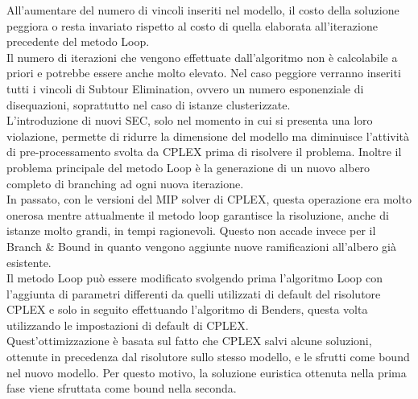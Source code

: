 \vspace{0.5 cm}
All'aumentare del numero di vincoli inseriti nel modello, il costo della soluzione peggiora o resta invariato rispetto al costo di quella elaborata all'iterazione precedente del metodo Loop.\\
Il numero di iterazioni che vengono effettuate dall'algoritmo non è calcolabile a priori e potrebbe essere anche molto elevato. Nel caso peggiore verranno inseriti tutti i vincoli di Subtour Elimination, ovvero un numero esponenziale di disequazioni, soprattutto nel caso di istanze clusterizzate.\\
L'introduzione di nuovi SEC, solo nel momento in cui si presenta una loro violazione, permette di ridurre la dimensione del modello ma diminuisce l'attività di pre-processamento svolta da CPLEX prima di risolvere il problema. Inoltre il problema principale del metodo Loop è la generazione di un nuovo albero completo di branching ad ogni nuova iterazione.\\
In passato, con le versioni del MIP solver di CPLEX, questa operazione era molto onerosa mentre attualmente il metodo loop garantisce la risoluzione, anche di istanze molto grandi, in tempi ragionevoli. Questo non accade invece per il Branch \& Bound in quanto vengono aggiunte nuove ramificazioni all'albero già esistente.\\
Il metodo Loop può essere modificato svolgendo prima l'algoritmo Loop con l'aggiunta di parametri differenti da quelli utilizzati di default del risolutore CPLEX e solo in seguito effettuando l'algoritmo di Benders, questa volta utilizzando le impostazioni di default di CPLEX. \\
Quest'ottimizzazione è basata sul fatto che CPLEX salvi alcune soluzioni, ottenute in precedenza dal risolutore sullo stesso modello, e le sfrutti come bound nel nuovo modello. Per questo motivo, la soluzione euristica ottenuta nella prima fase viene sfruttata come bound nella seconda.

